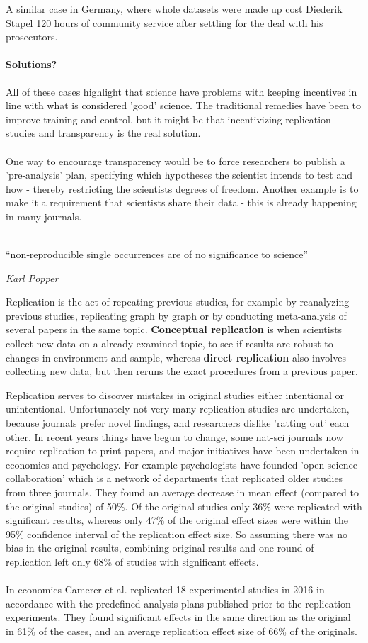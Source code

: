 \documentclass[12pt, a4paper]{article}
\begin{document}
\begin{multicols}{2}
A similar case in Germany, where whole datasets were made up cost Diederik Stapel 120 hours of community service after settling for the deal with his prosecutors. 

\paragraph{Solutions?} All of these cases highlight that science have problems with keeping incentives in line with what is considered 'good' science. The traditional remedies have been to improve training and control, but it might be that incentivizing replication studies and transparency is the real solution. 
\\ \\
One way to encourage transparency would be to force researchers to publish a 'pre-analysis' plan, specifying which hypotheses the scientist intends to test and how - thereby restricting the scientists degrees of freedom. Another example is to make it a requirement that scientists share their data - this is already happening in many journals.
\\ \\
\epigraph{“non‐reproducible single occurrences are of no significance to science”}{\textit{Karl Popper}}
Replication is the act of repeating previous studies, for example by reanalyzing previous studies, replicating graph by graph or by conducting meta-analysis of several papers in the same topic. \textbf{Conceptual replication} is when scientists collect new data on a already examined topic, to see if results are robust to changes in environment and sample, whereas \textbf{direct replication} also involves collecting new data, but then reruns the exact procedures from a previous paper. 

Replication serves to discover mistakes in original studies either intentional or unintentional. Unfortunately not very many replication studies are undertaken, because journals prefer novel findings, and researchers dislike 'ratting out' each other. In recent years things have begun to change, some nat-sci journals now require replication to print papers, and major initiatives have been undertaken in economics and psychology. For example psychologists have founded 'open science collaboration' which is a network of departments that replicated older studies from three journals. They found an average decrease in mean effect (compared to the original studies) of 50\%. Of the original studies only 36\% were replicated with significant results, whereas only 47\% of the original effect sizes were within the 95\% confidence interval of the replication effect size. So assuming there was no bias in the original results, combining original results and one round of replication left only 68\% of studies with significant effects.
\\ \\
In economics Camerer et al. replicated 18 experimental studies in 2016 in accordance with the predefined analysis plans published prior to the replication experiments. They found significant effects in the same direction as the original in 61\% of the cases, and an average replication effect size of 66\% of the originals.  


\end{multicols}
\end{document}
